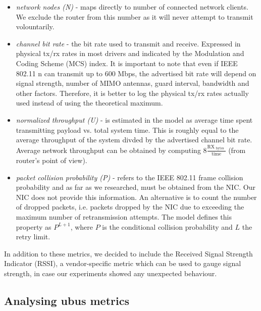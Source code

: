 \begin{itemize}

    \item \emph{network nodes (N)} - maps directly to number of connected network clients. We exclude
    the router from this number as it will never attempt to transmit volountarily.

    \item \emph{channel bit rate} - the bit rate used to transmit and receive.
    Expressed in physical tx/rx rates in most drivers and indicated by the
    Modulation and Coding Scheme (MCS) index. It is important to note that even if
    IEEE 802.11 n can transmit up to 600 Mbps, the advertised bit rate will depend
    on signal strength, number of MIMO antennas, guard interval, bandwidth and
    other factors. Therefore, it is better to log the physical tx/rx rates
    actually used instead of using the theoretical maximum.

    \item \emph{normalized throughput (U)} - is estimated in the model as average time
    spent transmitting payload vs. total system time. This is roughly equal to the average
    throughput of the system divded by the advertised channel bit rate. Average network throughput
    can be obtained by computing $ 8 \frac{ \text{RX}_\text{ bytes } }{ \text{time} } $ (from router's point of view).

    \item \emph{packet collision probability (P)} - refers to the IEEE 802.11
    frame collision probability and as far as we researched, must be obtained from
    the NIC. Our NIC does not provide this information. An alternative is to count
    the number of dropped packets, i.e. packets dropped by the NIC due to
    exceeding the maximum number of retransmission attempts. The model defines
    this property as $P^{L+1}$, where $P$ is the conditional collision probability
    and $L$ the retry limit.

\end{itemize}

In addition to these metrics, we decided to include the Received Signal
Strength Indicator (RSSI), a vendor-specific metric which can be used to gauge
signal strength, in case our experiments showed any unexpected behaviour.

\subsection{Analysing ubus metrics}

